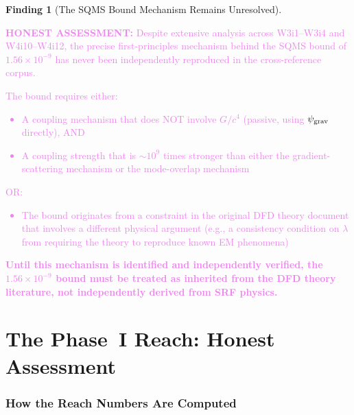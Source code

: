 \documentclass[11pt]{article}
\newcommand{\lam}{\lambda}
\newcommand{\ee}[1]{\times 10^{#1}}
\newcommand{\psigrav}{\psi_{\rm grav}}
\newcommand{\honest}[1]{\textcolor{violet}{\textbf{HONEST ASSESSMENT:} #1}}
\theoremstyle{definition}
\newtheorem{finding}[theorem]{Finding}
\theoremstyle{remark}
\begin{document}
\begin{finding}[The SQMS Bound Mechanism Remains Unresolved]
\label{find:unresolved}
\honest{Despite extensive analysis across W3i1--W3i4 and W4i10--W4i12,
the precise first-principles mechanism behind the SQMS bound of
$1.56\ee{-9}$ has never been independently reproduced in the
cross-reference corpus.

The bound requires either:
\begin{itemize}[nosep]
\item A coupling mechanism that does NOT involve $G/c^4$ (passive,
  using $\psigrav$ directly), AND
\item A coupling strength that is $\sim 10^{9}$ times stronger than
  either the gradient-scattering mechanism or the mode-overlap
  mechanism
\end{itemize}

OR:
\begin{itemize}[nosep]
\item The bound originates from a constraint in the original DFD
  theory document that involves a different physical argument
  (e.g., a consistency condition on $\lam$ from requiring
  the theory to reproduce known EM phenomena)
\end{itemize}

\textbf{Until this mechanism is identified and independently verified,
the $1.56\ee{-9}$ bound must be treated as inherited from the DFD
theory literature, not independently derived from SRF physics.}}
\end{finding}


\part{The Phase~I Reach: Honest Assessment}
\label{part:reach}


\section{How the Reach Numbers Are Computed}
\label{sec:reach_computation}
\end{document}
